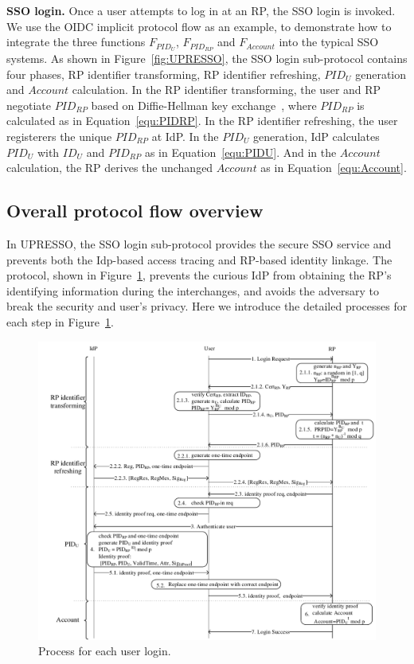 \vspace{1mm}\noindent\textbf{SSO login.}
Once a user attempts to log in at an RP, the SSO login is invoked. We use the OIDC implicit protocol flow as an example, to demonstrate  how to integrate the three functions $F_{PID_U}$, $F_{PID_{RP}}$ and $F_{Account}$ into the typical SSO systems.
As shown in Figure~\ref{fig:UPRESSO}, the SSO login sub-protocol contains four phases, RP identifier transforming, RP identifier refreshing, $PID_U$ generation and $Account$ calculation. 
In the RP identifier transforming, the user and RP negotiate $PID_{RP}$ based on Diffie-Hellman key exchange~\cite{DiffieH76}, where $PID_{RP}$ is calculated as in Equation~\ref{equ:PIDRP}.
In the RP identifier refreshing, the user registerers the unique  $PID_{RP}$ at IdP. 
In the $PID_U$ generation, IdP calculates $PID_U$ with $ID_U$ and $PID_{RP}$ as in Equation~\ref{equ:PIDU}. 
And in the $Account$ calculation, the RP derives the unchanged $Account$ as in Equation~\ref{equ:Account}. 

\subsection{Overall protocol flow overview}
\label{sebsec:loginprocess}
In UPRESSO, the SSO login sub-protocol provides the secure SSO service and prevents both the Idp-based access tracing and RP-based identity linkage.
The protocol, shown in Figure~\ref{fig:process},  prevents the curious IdP from obtaining the RP's identifying information during the interchanges,
  and avoids the adversary to break the security and user's privacy.
Here we introduce the detailed processes for each step in Figure~\ref{fig:process}.

\begin{figure}
  \centering
  \includegraphics[width=0.85\linewidth]{fig/process.pdf}
  \caption{Process for each user login.}
  \label{fig:process}
\end{figure}

